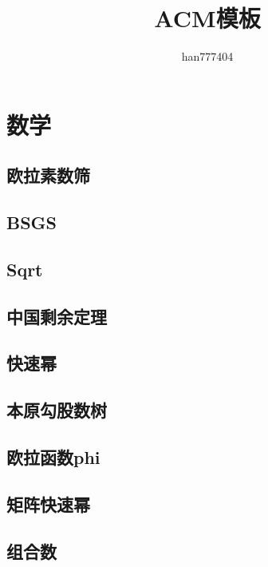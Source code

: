 \documentclass[twocolumn,a4,twoside]{article}
\title{\CJKfamily{hei} {\bfseries ACM模板}}
\author{han777404}
\begin{document}
\small
	\pagestyle{headings}
	\begin{titlepage}
		\maketitle
	\end{titlepage}
	\newpage
	\pagestyle{empty}
	\renewcommand{\contentsname}{目录}
	\tableofcontents
	\newpage\clearpage
	\newpage
	\pagestyle{fancy}
	\setcounter{page}{1}   
	
	

	\section{数学}
		\subsection{欧拉素数筛}
		
		\subsection{BSGS}
		
		\subsection{Sqrt}
		
		\subsection{中国剩余定理}
		
		\subsection{快速幂}
		
		\subsection{本原勾股数树}
		
		\subsection{欧拉函数phi}
		
		\subsection{矩阵快速幂}
		
		\subsection{组合数}
		
	
\end{document}
